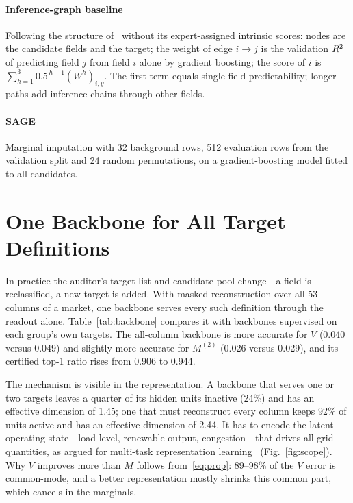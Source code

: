 \paragraph{Inference-graph baseline} Following the structure of~\cite{hu2026ignn} without its
expert-assigned intrinsic scores: nodes are the candidate fields and the target; the weight of edge
$i\to j$ is the validation $R^{2}$ of predicting field $j$ from field $i$ alone by gradient boosting; the
score of $i$ is $\sum_{h=1}^{3}0.5^{\,h-1}(W^{h})_{i,y}$. The first term equals single-field
predictability; longer paths add inference chains through other fields.

\paragraph{SAGE} Marginal imputation with 32 background rows, 512 evaluation rows from the
validation split and 24 random permutations, on a gradient-boosting model fitted to all candidates.



\section{One Backbone for All Target Definitions}\label{app:scope}
In practice the auditor's target list and candidate pool change---a field is reclassified, a new
target is added. With masked reconstruction over all 53 columns of a market, one backbone serves
every such definition through the readout alone. Table~\ref{tab:backbone} compares it with
backbones supervised on each group's own targets. The all-column backbone is more accurate for
$V$ (0.040 versus 0.049) and slightly more accurate for $M^{(2)}$ (0.026 versus 0.029), and its
certified top-1 ratio rises from 0.906 to 0.944.

The mechanism is visible in the representation. A backbone that serves one or two targets leaves a
quarter of its hidden units inactive (24\%) and has an effective dimension of 1.45; one that must
reconstruct every column keeps 92\% of units active and has an effective dimension of 2.44. It has
to encode the latent operating state---load level, renewable output, congestion---that drives all
grid quantities, as argued for multi-task representation
learning~\cite{caruana1997multitask,baxter2000inductive,maurer2016benefit} (Fig.~\ref{fig:scope}). Why $V$ improves more
than $M$ follows from~\eqref{eq:prop}: 89--98\% of the $V$ error is common-mode, and a better
representation mostly shrinks this common part, which cancels in the marginals.

